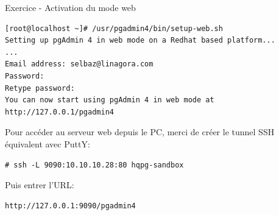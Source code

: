 \begin{frame}[fragile]{Exercice - Activation du mode web}

   \begin{itemize}

\begin{tiny}
\begin{Verbatim}[commandchars=\\\{\}]
[root@localhost ~]# /usr/pgadmin4/bin/setup-web.sh
Setting up pgAdmin 4 in web mode on a Redhat based platform...
...
Email address: selbaz@linagora.com
Password: 
Retype password:
You can now start using pgAdmin 4 in web mode at http://127.0.0.1/pgadmin4
\end{Verbatim}
\end{tiny}

Pour accéder au serveur web depuis le PC, merci de créer le tunnel SSH équivalent avec PuttY:
\begin{tiny}
\begin{Verbatim}[commandchars=\\\{\}]
# ssh -L 9090:10.10.10.28:80 hqpg-sandbox
\end{Verbatim}
\end{tiny}

Puis entrer l'URL:
\begin{tiny}
\begin{Verbatim}[commandchars=\\\{\}]
http://127.0.0.1:9090/pgadmin4
\end{Verbatim}
\end{tiny}

\end{itemize}

\end{frame}


